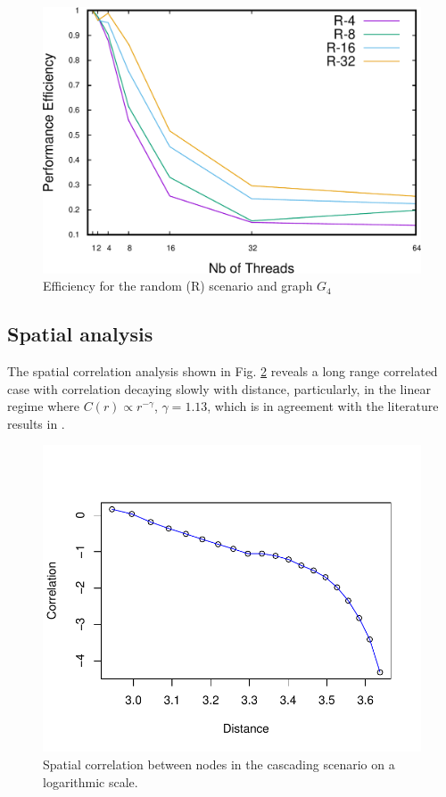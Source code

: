 \begin{figure}
\centering
\includegraphics[scale=0.35]{bench/bench-efficiency/efficiency-r-4-crop.pdf}
\caption{Efficiency for the random (R) scenario and graph $G_4$}
\label{fig:effr4}
\end{figure}



\subsection{Spatial analysis}
The spatial correlation analysis shown in Fig. \ref{fig:correlation} reveals a long range correlated case with correlation decaying slowly with distance, particularly, in the linear regime where $C(r) \propto r^{-\gamma} $, $\gamma = 1.13$, which is in agreement with the literature results in \cite{DaqingAl14}.

\begin{figure}
\centering
\includegraphics[scale=0.65]{bench/correlation-eps-converted-to.pdf}
\caption{Spatial correlation between nodes in the cascading scenario on a logarithmic scale.}
\label{fig:correlation}
\end{figure}




